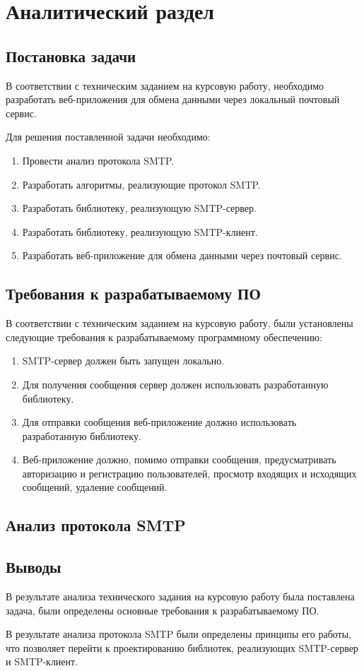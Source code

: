 \chapter{Аналитический раздел}

\section{Постановка задачи}

В соответствии с техническим заданием на курсовую работу, необходимо разработать веб-приложения для обмена данными через локальный почтовый сервис. 

Для решения поставленной задачи необходимо:
\begin{enumerate}
	\item Провести анализ протокола SMTP.
	\item Разработать алгоритмы, реализующие протокол SMTP.
	\item Разработать библиотеку, реализующую SMTP-сервер.
	\item Разработать библиотеку, реализующую SMTP-клиент.
	\item Разработать веб-приложение для обмена данными через почтовый сервис.
\end{enumerate}

\section{Требования к разрабатываемому ПО}

В соответствии с техническим заданием на курсовую работу, были установлены следующие требования к разрабатываемому программному обеспечению:
\begin{enumerate}
	\item SMTP-сервер должен быть запущен локально.
	\item Для получения сообщения сервер должен использовать разработанную библиотеку.
	\item Для отправки сообщения веб-приложение должно использовать разработанную библиотеку.
	\item Веб-приложение должно, помимо отправки сообщения, предусматривать авторизацию и регистрацию пользователей, просмотр входящих и исходящих сообщений, удаление сообщений.
\end{enumerate}

\section{Анализ протокола SMTP}

\section{Выводы}

В результате анализа технического задания на курсовую работу была поставлена задача, были определены основные требования к разрабатываемому ПО.

В результате анализа протокола SMTP были определены принципы его работы, что позволяет перейти к проектированию библиотек, реализующих SMTP-сервер и SMTP-клиент.